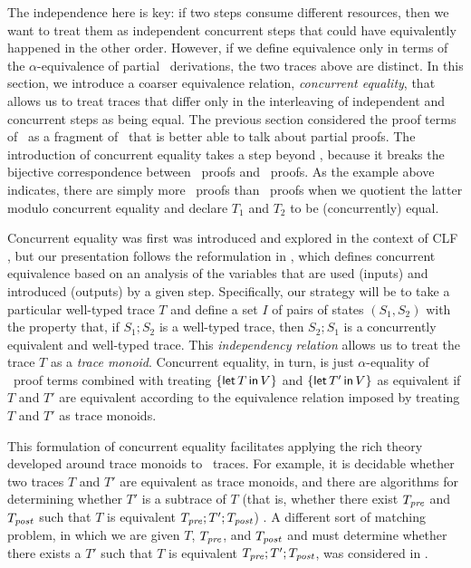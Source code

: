 The independence here is key: if two steps consume different
resources, then we want to treat them as independent concurrent steps
that could have equivalently happened in the other order. However, if
we define equivalence only in terms of the $\alpha$-equivalence of
partial \ollll~derivations, the two traces above are distinct. In this
section, we introduce a coarser equivalence relation, {\it concurrent
  equality}, that allows us to treat traces that differ only in the
interleaving of independent and concurrent steps as being equal.  The
previous section considered the proof terms of \sls~as a 
fragment of
\ollll~that is better able to talk about partial proofs.  The introduction of
concurrent equality takes a step beyond \ollll, because it breaks the
bijective correspondence between \ollll~proofs and \sls~proofs. As the
example above indicates, there are simply more \ollll~proofs than
\sls~proofs when we quotient the latter modulo concurrent equality and
declare $T_1$ and $T_2$ to be (concurrently) equal.

Concurrent equality was first was introduced and explored in the
context of CLF \cite{watkins02concurrent}, but our presentation
follows the reformulation in \cite{cervesato12trace}, which defines
concurrent equivalence based on an analysis of the variables that are
used (inputs) and introduced (outputs) by a given step.  Specifically,
our strategy will be to take a particular well-typed trace $T$ and
define a set $I$ of pairs of states $(S_1, S_2)$ with the property
that, if $S_1; S_2$ is a well-typed trace, then $S_2; S_1$ is a
concurrently equivalent and well-typed trace.  This {\it independency
  relation} allows us to treat the trace $T$ as a {\it trace
  monoid}. Concurrent equality, in turn, is just $\alpha$-equality of
\sls~proof terms combined with treating $\{{\sf let}\,{T}\,{\sf in}\, {V} \}$ and
$\{{\sf let}\,{T'}\,{\sf in}\, {V} \}$ as equivalent if $T$ and $T'$ are equivalent
according to the equivalence relation imposed by treating $T$ and $T'$
as trace monoids.

This formulation of concurrent equality facilitates applying the rich
theory developed around trace monoids to \sls~traces.  For example, it
is decidable whether two traces $T$ and $T'$ are equivalent as trace
monoids, and there are algorithms for determining whether $T'$ is a
subtrace of $T$ (that is, whether there exist $T_{\it pre}$ and
$T_{\it post}$ such that $T$ is equivalent $T_{\it pre}; T'; T_{\it
  post}$) \cite{diekert90combinatorics}. A different sort of matching
problem, in which we are given $T$, $T_{\it pre}$, and $T_{\it post}$
and must determine whether there exists a $T'$ such that $T$ is
equivalent $T_{\it pre}; T'; T_{\it post}$, was considered in
\cite{cervesato12trace}.

